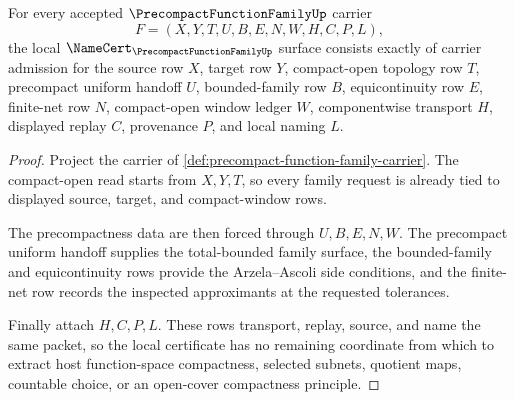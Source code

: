 \begin{theorem}
\label{thm:precompact-function-family-namecert-obligations}
For every accepted $\PrecompactFunctionFamilyUp$ carrier
$$
F=(X,Y,T,U,B,E,N,W,H,C,P,L),
$$
the local $\NameCert_{\PrecompactFunctionFamilyUp}$ surface consists exactly of carrier admission for the source row $X$, target row $Y$, compact-open topology row $T$, precompact uniform handoff $U$, bounded-family row $B$, equicontinuity row $E$, finite-net row $N$, compact-open window ledger $W$, componentwise transport $H$, displayed replay $C$, provenance $P$, and local naming $L$.
\end{theorem}
\begin{proof}
Project the carrier of \autoref{def:precompact-function-family-carrier}. The compact-open read starts from $X,Y,T$, so every family request is already tied to displayed source, target, and compact-window rows.

The precompactness data are then forced through $U,B,E,N,W$. The precompact uniform handoff supplies the total-bounded family surface, the bounded-family and equicontinuity rows provide the Arzela--Ascoli side conditions, and the finite-net row records the inspected approximants at the requested tolerances.

Finally attach $H,C,P,L$. These rows transport, replay, source, and name the same packet, so the local certificate has no remaining coordinate from which to extract host function-space compactness, selected subnets, quotient maps, countable choice, or an open-cover compactness principle.
\end{proof}

